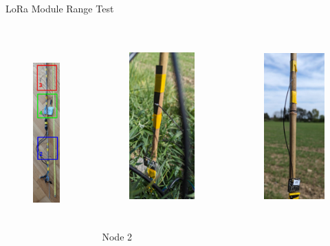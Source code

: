 \documentclass[hyphens]{beamer}
\begin{document}
\begin{frame}{LoRa Module Range Test}
\begin{columns}[T]
\begin{column}{.3\textwidth}
    \centering
    \begin{figure}
        \includegraphics[height=7.5cm]{img/lora-pole.jpg}
    \end{figure}
\end{column}
\hfil
\begin{column}{.3\textwidth}
    \centering
    \begin{figure}
        \includegraphics[height=7cm]{../thesis/img/range-pole-bottom.jpg}
    \end{figure}
    \vspace{-1em}
    Node 2
\end{column}
\hfil
\begin{column}{.3\textwidth}
    \centering
    \begin{figure}
        \includegraphics[height=7cm]{../thesis/img/range-pole-top.jpg}

\end{figure}
\end{column}
\end{columns}
\end{frame}
\end{document}
